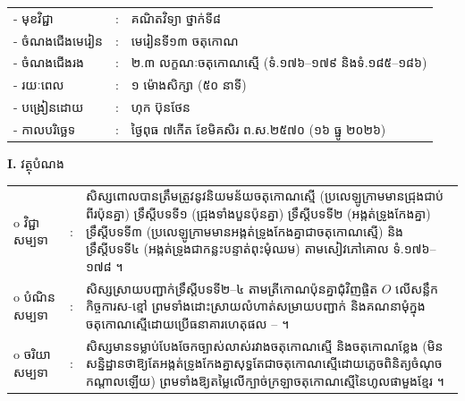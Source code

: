 \documentclass[a4paper,10pt]{article}
\newcommand{\wcirc}{{\CourierBullet\fontsize{9.5pt}{11pt}\selectfont o}}
\newcommand{\cnum}[1]{{\fontsize{10.5pt}{12pt}\selectfont\ding{\numexpr171+#1\relax}}\hspace{0.2em}}
\begin{document}
{\renewcommand{\arraystretch}{0.95}
\hspace*{4.05cm}%
\begin{tabular}{@{}l l l@{}}
  - \hspace{0.35cm} មុខវិជ្ជា & : & គណិតវិទ្យា ថ្នាក់ទី៨ \\
  - \hspace{0.35cm} ចំណងជើងមេរៀន & : & មេរៀនទី១៣ ចតុកោណ \\
  - \hspace{0.35cm} ចំណងជើងរង & : & ២.៣ លក្ខណៈចតុកោណស្មើ (ទំ.១៧៦--១៧៩ និងទំ.១៨៥--១៨៦) \\
  - \hspace{0.35cm} រយៈពេល & : & ១ ម៉ោងសិក្សា (៥០ នាទី) \\
  - \hspace{0.35cm} បង្រៀនដោយ & : & ហុក ប៊ុនថែន \\
  - \hspace{0.35cm} កាលបរិច្ឆេទ & : & ថ្ងៃពុធ ៧កើត ខែមិគសិរ ព.ស.២៥៧០ (១៦ ធ្នូ ២០២៦) \\
\end{tabular}

\vspace{1pt}

\textbf{I.} {\muol វត្ថុបំណង}\\[1pt]
\hspace*{0.55cm}%
\begin{tabular}{@{}l l L{14.2cm}@{}}
  \wcirc \hspace{0.25cm} វិជ្ជាសម្បទា & : & សិស្សពោលបានត្រឹមត្រូវនូវនិយមន័យចតុកោណស្មើ (ប្រលេឡូក្រាមមានជ្រុងជាប់ពីរប៉ុនគ្នា) ទ្រឹស្ដីបទទី១ (ជ្រុងទាំងបួនប៉ុនគ្នា) ទ្រឹស្ដីបទទី២ (អង្កត់ទ្រូងកែងគ្នា) ទ្រឹស្ដីបទទី៣ (ប្រលេឡូក្រាមមានអង្កត់ទ្រូងកែងគ្នាជាចតុកោណស្មើ) និងទ្រឹស្ដីបទទី៤ (អង្កត់ទ្រូងជាកន្លះបន្ទាត់ពុះមុំឈម) តាមសៀវភៅគោល ទំ.១៧៦--១៧៨ ។ \\
  \wcirc \hspace{0.25cm} បំណិនសម្បទា & : & សិស្សស្រាយបញ្ជាក់ទ្រឹស្ដីបទទី២--៤ តាមត្រីកោណប៉ុនគ្នាជុំវិញផ្ចិត $O$ លើសន្លឹកកិច្ចការស-ខ្មៅ ព្រមទាំងដោះស្រាយលំហាត់សម្រាយបញ្ជាក់ និងគណនាមុំក្នុងចតុកោណស្មើដោយប្រើធនាគារហេតុផល \cnum{1}--\cnum{5} ។ \\
  \wcirc \hspace{0.25cm} ចរិយាសម្បទា & : & សិស្សមានទម្លាប់បែងចែកច្បាស់លាស់រវាងចតុកោណស្មើ និងចតុកោណខ្លែង (មិនសន្និដ្ឋានថាឱ្យតែអង្កត់ទ្រូងកែងគ្នាសុទ្ធតែជាចតុកោណស្មើដោយភ្លេចពិនិត្យចំណុចកណ្ដាលឡើយ) ព្រមទាំងឱ្យតម្លៃលើក្បាច់ក្រឡាចតុកោណស្មើនៃហូលផាមួងខ្មែរ ។ \\
\end{tabular}

}
\end{document}

